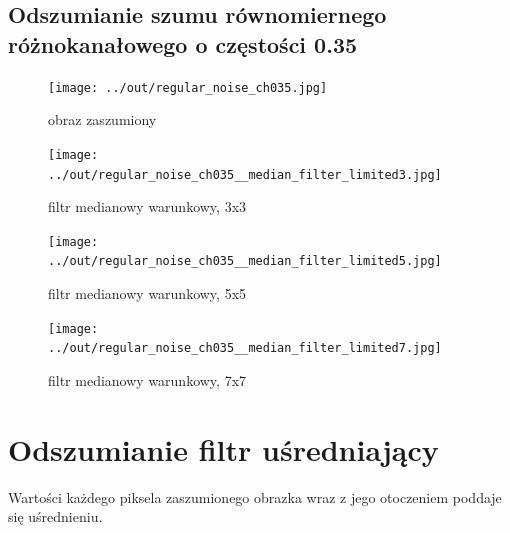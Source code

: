 \documentclass[a4paper,12pt]{article}
\begin{document}
\newpage
\subsection{Odszumianie szumu równomiernego różnokanałowego o częstości 0.35}
\begin{figure}[h!]
\begin{minipage}[t]{7.5cm}
\begin{center}
\texttt{[image: ../out/regular\_noise\_ch035.jpg]}
\caption{obraz zaszumiony}
\end{center}
\end{minipage}
\hfill
\begin{minipage}[t]{7.5cm}
\begin{center}
\texttt{[image: ../out/regular\_noise\_ch035\_\_median\_filter\_limited3.jpg]}
\caption{filtr medianowy warunkowy, 3x3}
\end{center}
\end{minipage}
\end{figure}

\begin{figure}[h!]
\begin{minipage}[t]{7.5cm}
\begin{center}
\texttt{[image: ../out/regular\_noise\_ch035\_\_median\_filter\_limited5.jpg]}
\caption{filtr medianowy warunkowy, 5x5}
\end{center}
\end{minipage}
\hfill
\begin{minipage}[t]{7.5cm}
\begin{center}
\texttt{[image: ../out/regular\_noise\_ch035\_\_median\_filter\_limited7.jpg]}
\caption{filtr medianowy warunkowy, 7x7}
\end{center}
\end{minipage}
\end{figure}









\newpage
\section{Odszumianie filtr uśredniający}
Wartości każdego piksela zaszumionego obrazka wraz z jego otoczeniem poddaje się uśrednieniu.




\newpage
\end{document}
